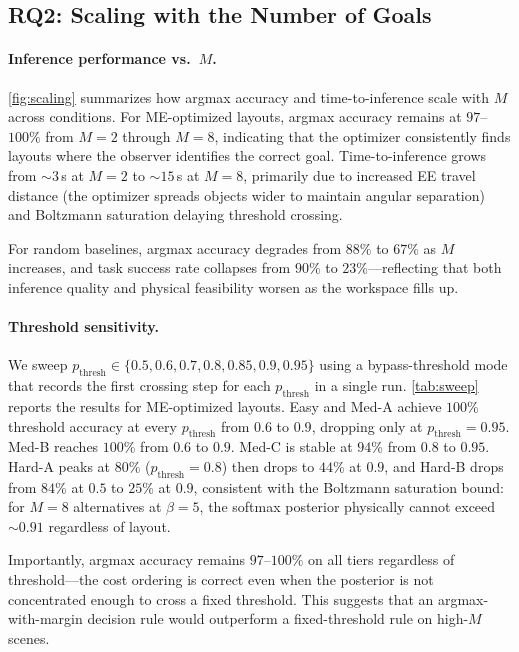 \documentclass[letterpaper, 10pt, conference]{ieeeconf}
\begin{document}
\subsection{RQ2: Scaling with the Number of Goals}
\label{sec:rq2_results}

\paragraph{Inference performance vs.\ $M$.}
\cref{fig:scaling} summarizes how argmax accuracy and time-to-inference
scale with $M$ across conditions.  For ME-optimized layouts, argmax
accuracy remains at $97$--$100\%$ from $M{=}2$ through $M{=}8$,
indicating that the optimizer consistently finds layouts where the
observer identifies the correct goal.  Time-to-inference grows from
$\sim 3$\,s at $M{=}2$ to $\sim 15$\,s at $M{=}8$, primarily due
to increased EE travel distance (the optimizer spreads objects wider
to maintain angular separation) and Boltzmann saturation delaying
threshold crossing.

For random baselines, argmax accuracy degrades from $88$\% to $67$\%
as $M$ increases, and task success rate collapses from $90$\% to
$23$\%---reflecting that both inference quality and physical
feasibility worsen as the workspace fills up.

\paragraph{Threshold sensitivity.}
We sweep $p_{\mathrm{thresh}} \in \{0.5, 0.6, 0.7, 0.8, 0.85, 0.9,
0.95\}$ using a bypass-threshold mode that records the first
crossing step for each $p_{\mathrm{thresh}}$ in a single run.
\cref{tab:sweep} reports the results for ME-optimized layouts.
Easy and Med-A achieve $100$\% threshold accuracy at every
$p_{\mathrm{thresh}}$ from $0.6$ to $0.9$, dropping only at
$p_{\mathrm{thresh}}{=}0.95$.  Med-B reaches $100$\% from $0.6$ to
$0.9$.  Med-C is stable at $94$\% from $0.8$ to $0.95$.
Hard-A peaks at $80$\% (${p_{\mathrm{thresh}}}{=}0.8$) then drops
to $44$\% at $0.9$, and Hard-B drops from $84$\% at $0.5$ to
$25$\% at $0.9$, consistent with the Boltzmann saturation bound:
for $M{=}8$ alternatives at $\beta{=}5$, the softmax posterior
physically cannot exceed $\sim 0.91$ regardless of layout.

Importantly, argmax accuracy remains $97$--$100\%$ on all tiers
regardless of threshold---the cost ordering is correct even when
the posterior is not concentrated enough to cross a fixed threshold.
This suggests that an argmax-with-margin decision rule would
outperform a fixed-threshold rule on high-$M$ scenes.
\end{document}
